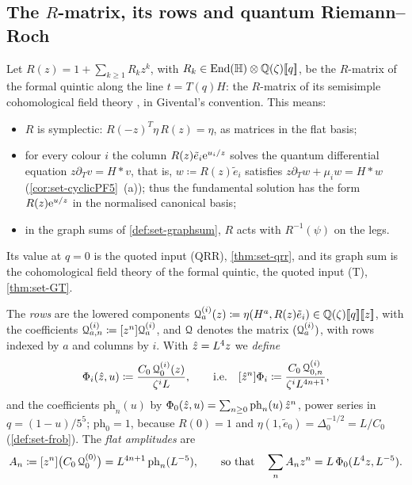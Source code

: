 
\subsection{The \texorpdfstring{$R$}{R}-matrix, its rows and quantum Riemann--Roch}
\label{sec:set-rows}

\begin{defn}
\label{def:set-rows}
Let $R(z)=1+\sum_{k\geq1}R_kz^k$, with $R_k\in\operatorname{End}(\mathbb{H})\otimes\mathbb{Q}(\zeta)[\![ q ]\!]$, be the $R$-matrix of the formal quintic along the line $t=T(q)H$: the $R$-matrix of its semisimple cohomological field theory \cite[Section~4.1]{GJR18}, in Givental's convention. This means:
\begin{itemize}
\item[(a)] $R$ is symplectic: $R(-z)^T\eta\,R(z)=\eta$, as matrices in the flat basis;
\item[(b)] for every colour $i$ the column $R(z)\tilde e_i\mathrm{e}^{u_i/z}$ solves the quantum differential equation $z\partial_Tv=H*v$, that is, $w\coloneqq R(z)\tilde e_i$ satisfies $z\partial_Tw+\mu_iw=H*w$ (\cref{cor:set-cyclicPF5}~(a)); thus the fundamental solution has the form $R(z)\mathrm{e}^{u/z}$ in the normalised canonical basis;
\item[(c)] in the graph sums of \cref{def:set-graphsum}, $R$ acts with $R^{-1}(\psi)$ on the legs.
\end{itemize}
Its value at $q=0$ is the quoted input (QRR), \cref{thm:set-qrr}, and its graph sum is the cohomological field theory of the formal quintic, the quoted input (T), \cref{thm:set-GT}.

The \emph{rows} are the lowered components $\mathcal{Q}^{(i)}_a(z)\coloneqq\eta(H^a,R(z)\tilde e_i)\in\mathbb{Q}(\zeta)[\![ q ]\!][\![ z ]\!]$, with the coefficients $\mathcal{Q}^{(i)}_{a,n}\coloneqq[z^n]\mathcal{Q}^{(i)}_a$, and $\mathcal{Q}$ denotes the matrix $(\mathcal{Q}^{(i)}_a)$, with rows indexed by $a$ and columns by $i$. With $\hat{z}=L^4z$ we \emph{define}
\[
\Phi_i(\hat{z},u)\coloneqq\frac{C_0\,\mathcal{Q}^{(i)}_0(z)}{\zeta^iL},\qquad\text{i.e.}\quad[\hat{z}^n]\Phi_i\coloneqq\frac{C_0\,\mathcal{Q}^{(i)}_{0,n}}{\zeta^iL^{4n+1}},
\]
and the coefficients $\mathrm{ph}_n(u)$ by $\Phi_0(\hat{z},u)=\sum_{n\geq0}\mathrm{ph}_n(u)\,\hat{z}^n$, power series in $q=(1-u)/5^5$; $\mathrm{ph}_0=1$, because $R(0)=1$ and $\eta(1,\tilde e_0)=\Delta_0^{-1/2}=L/C_0$ (\cref{def:set-frob}). The \emph{flat amplitudes} are
\[
A_n\coloneqq[z^n]\bigl(C_0\,\mathcal{Q}^{(0)}_0\bigr)=L^{4n+1}\,\mathrm{ph}_n(L^{-5}),\qquad\text{so that}\quad\sum_nA_nz^n=L\,\Phi_0(L^4z,L^{-5}).
\]
\end{defn}

